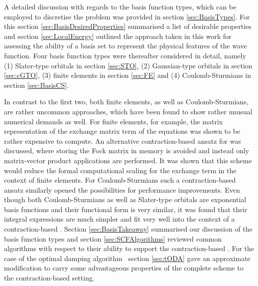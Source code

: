 
A detailed discussion with regards to the basis function types,
which can be employed to discretise the \HF problem
was provided in section \ref{sec:BasisTypes}.
For this section \ref{sec:BasisDesiredProperties}
summarised a list of desirable properties
and section \ref{sec:LocalEnergy}
outlined the approach taken in this work for
assessing the ability of a basis set to represent the physical
features of the wave function.
Four basis function types were thereafter considered in detail,
namely (1) Slater-type orbitals in section \ref{sec:STO},
(2) Gaussian-type orbitals in section \ref{sec:cGTO},
(3) finite elements in section \ref{sec:FE}
and (4) Coulomb-Sturmians in section \ref{sec:BasisCS}.

In contrast to the first two,
both finite elements,
as well as Coulomb-Sturmians,
are rather uncommon approaches,
which have been found to show rather unusual numerical demands as well.
For finite elements, for example,
the matrix representation of the exchange matrix term of the \HF equations
was shown to be rather expensive to compute.
An alternative contraction-based ansatz for \HF was discussed,
where storing the Fock matrix in memory is avoided
and instead only matrix-vector product applications are performed.
It was shown that this scheme would reduce
the formal computational scaling
for the exchange term in the context of finite elements.
For Coulomb-Sturmians such a contraction-based \SCF
ansatz similarly opened the possibilities for performance improvements.
Even though both Coulomb-Sturmians as well as Slater-type
orbitals are exponential basis functions
and their functional form is very similar,
it was found that their integral expressions are much simpler
and fit very well into the context of a contraction-based \SCF.
Section \ref{sec:BasisTakeaway} summarised our discussion of the basis
function types and section \ref{sec:SCFAlgorithms}
reviewed common \SCF algorithms
with respect to their ability to support the contraction-based \SCF.
For the case of the optimal damping algorithm~\cite{Cances2000a}
section \ref{sec:tODA} gave an approximate modification
to carry some advantageous
properties of the complete scheme to the contraction-based setting.


